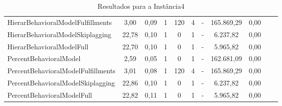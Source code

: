 \begin{table}[h!]
{\begin{tabular}{lcccccccccc}
			HierarBehavioralModelFulfillments  & 3,00   & 0,09 & 1 & 120 & 4 & -          & 165.869,29 & 0,00 \\ 
			HierarBehavioralModelSkiplagging   & 22,78  & 0,10 & 1 & 0   & 1 & -          & 6.237,82   & 0,00 \\ 
			HierarBehavioralModelFull          & 22,70  & 0,10 & 1 & 0   & 1 & -          & 5.965,82   & 0,00 \\ \hline
			PercentBehavioralModel             & 2,59   & 0,05 & 1 & 0   & 1 & -          & 162.681,09 & 0,00 \\ 
			PercentBehavioralModelFulfillments & 3,01   & 0,08 & 1 & 120 & 4 & -          & 165.869,29 & 0,00 \\ 
			PercentBehavioralModelSkiplagging  & 22,86  & 0,10 & 1 & 0   & 1 & -          & 6.237,82   & 0,00 \\ 
			PercentBehavioralModelFull         & 22,82  & 0,11 & 1 & 0   & 1 & -          & 5.965,82   & 0,00 \\ \hline
		\end{tabular}%
	}
	\caption{Resultados para a Instância4}
	\label{tab:resul_instan4}
\end{table}


